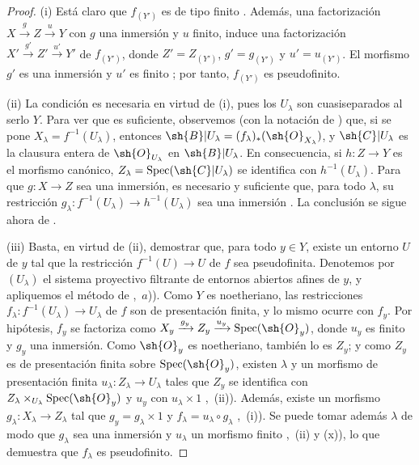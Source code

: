 \begin{proof}
(i) Está claro que $f_{(Y')}$ es de tipo finito . Además, una factorización $X\xrightarrow{g}Z\xrightarrow{u}Y$ con $g$ una inmersión y $u$ finito, induce una factorización $X'\xrightarrow{g'}Z'\xrightarrow{u'}Y'$ de $f_{(Y')}$, donde $Z'=Z_{(Y')}$, $g'=g_{(Y')}$ y $u'=u_{(Y')}$. El morfismo $g'$ es una inmersión  y $u'$ es finito ; por tanto, $f_{(Y')}$ es pseudofinito.

(ii) La condición es necesaria en virtud de (i), pues los $U_\lambda$ son cuasiseparados al serlo $Y$.
Para ver que es suficiente, observemos (con la notación de ) que, si se pone $X_\lambda=f^{-1}(U_\lambda)$, entonces $\sh{B}|U_\lambda=(f_\lambda)_*(\sh{O}_{X_\lambda})$, y $\sh{C}|U_\lambda$ es la clausura entera de $\sh{O}_{U_\lambda}$ en $\sh{B}|U_\lambda$. En consecuencia, si $h:Z\to Y$ es el morfismo canónico, $Z_\lambda=\operatorname{Spec}(\sh{C}|U_\lambda)$ se identifica con $h^{-1}(U_\lambda)$. Para que $g:X\to Z$ sea una inmersión, es necesario y suficiente que, para todo $\lambda$, su restricción $g_\lambda:f^{-1}(U_\lambda)\to h^{-1}(U_\lambda)$ sea una inmersión . La conclusión se sigue ahora de .

(iii) Basta, en virtud de (ii), demostrar que, para todo $y\in Y$, existe un entorno $U$ de $y$ tal que la restricción $f^{-1}(U)\to U$ de $f$ sea pseudofinita.
Denotemos por $(U_\lambda)$ el sistema proyectivo filtrante de entornos abiertos afines de $y$, y apliquemos el método de ,~$a$)).
Como $Y$ es noetheriano, las restricciones $f_\lambda:f^{-1}(U_\lambda)\to U_\lambda$ de $f$ son de presentación finita, y lo mismo ocurre con $f_y$.
Por hipótesis, $f_y$ se factoriza como $X_y\xrightarrow{g_y}Z_y\xrightarrow{u_y}\operatorname{Spec}(\sh{O}_y)$, donde $u_y$ es finito y $g_y$ una inmersión.
Como $\sh{O}_y$ es noetheriano, también lo es $Z_y$; y como $Z_y$ es de presentación finita sobre $\operatorname{Spec}(\sh{O}_y)$, existen $\lambda$ y un morfismo de presentación finita $u_\lambda:Z_\lambda\to U_\lambda$ tales que $Z_y$ se identifica con $Z_\lambda\times_{U_\lambda}\operatorname{Spec}(\sh{O}_y)$ y $u_y$ con $u_\lambda\times 1$ ,~(ii)). Además, existe un morfismo $g_\lambda:X_\lambda\to Z_\lambda$ tal que $g_y=g_\lambda\times 1$ y $f_\lambda=u_\lambda\circ g_\lambda$ ,~(i)). Se puede tomar además $\lambda$ de modo que $g_\lambda$ sea una inmersión y $u_\lambda$ un morfismo finito ,~(ii) y (x)), lo que demuestra que $f_\lambda$ es pseudofinito.
\end{proof}

